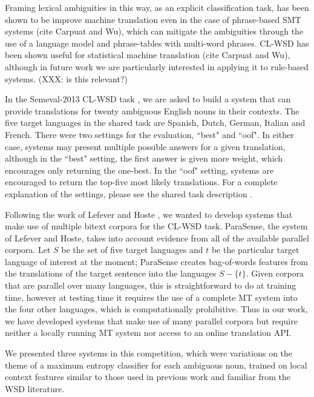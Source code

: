 \documentclass[11pt,letterpaper]{article}
\begin{document}
Framing lexical ambiguities in this way, as an explicit classification task,
has been shown to be improve machine translation even in the case of
phrase-based SMT systems (cite Carpuat and Wu), which can mitigate the
ambiguities through the use of a language model and phrase-tables with
multi-word phrases.
CL-WSD has been shown useful for statistical machine translation (cite Carpuat and Wu), although in future work we are particularly interested in applying it to rule-based systems. (XXX: is this relevant?)

In the Semeval-2013 CL-WSD task \cite{task10}, we are asked to build a system that can provide
translations for twenty ambiguous English nouns in their contexts. The five target languages in the shared task are Spanish, Dutch, German, Italian and French. There were two settings for the evaluation, ``best" and ``oof". In either case, systems may present multiple possible answers for a given translation, although in the ``best" setting, the first answer is given more weight, which encourages only returning the one-best. In the ``oof" setting, systems are encouraged to return the top-five most likely translations. For a complete explanation of the settings, please see the shared task description \cite{task10}.

Following the work of Lefever and Hoste
, we wanted to develop systems
that make use of multiple bitext corpora for the CL-WSD task.
ParaSense, the system of Lefever and Hoste, takes into account evidence from all of the available parallel corpora. Let $S$ be the set of five target languages and $t$ be the particular target language of interest at the moment; ParaSense creates bag-of-words features from the translations of the target sentence into the languages $S - \lbrace{t \rbrace}$. Given corpora that are parallel over many languages, this is straightforward to do at training time, however at testing time it requires the use of a complete MT system into the four other languages, which is computationally prohibitive. Thus in our work, we have developed systems that make use of many parallel corpora but require neither a locally running MT system nor access to an online translation API.

We presented three systems in this competition, which were variations on the
theme of a maximum entropy classifier for each ambiguous noun, trained on local
context features similar to those used in previous work and familiar from the
WSD literature.
\end{document}
